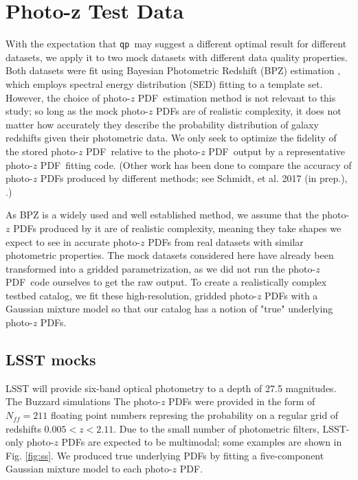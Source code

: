 \documentclass[\docopts]{\docclass}
\newcommand{\qp}{\texttt{qp}}
\newcommand{\pz}{photo-$z$ PDF}
\begin{document}
\section{Photo-z Test Data}
\label{sec:data}

With the expectation that \qp\  may suggest a different optimal result for 
different datasets, we apply it to two mock datasets with different data 
quality properties.  Both datasets were fit using Bayesian Photometric Redshift 
(BPZ) estimation \citep{benitez_bayesian_2000}, which employs spectral energy 
distribution (SED) fitting to a template set.  However, the choice of \pz\ 
estimation method is not relevant to this study; so long as the mock \pz s are 
of realistic complexity, it does not matter how accurately they describe the 
probability distribution of galaxy redshifts given their photometric data.  We 
only seek to optimize the fidelity of the stored \pz\ relative to the \pz\ 
output by a representative \pz\ fitting code.  (Other work has been done to 
compare the accuracy of \pz s produced by different methods; see Schmidt, et 
al. 2017 (in prep.), \citet{tanaka_photometric_2017}.)

As BPZ is a widely used and well established method, we assume that the \pz s 
produced by it are of realistic complexity, meaning they take shapes we expect 
to see in accurate \pz s from real datasets with similar photometric 
properties.  The mock datasets considered here have already been transformed 
into a gridded parametrization, as we did not run the \pz\ code ourselves to 
get the raw output.  To create a realistically complex testbed catalog, we fit 
these high-resolution, gridded \pz s with a Gaussian mixture model so that our 
catalog has a notion of "true" underlying \pz s.  


\subsection{LSST mocks}
\label{sec:ss}


LSST will provide six-band optical photometry to a depth of 27.5 magnitudes.  
  The Buzzard simulations The \pz s 
were provided in the form of $N_{ff}=211$ floating point numbers represing the 
probability on a regular grid of redshifts $0.005 < z < 2.11$.  Due to the 
small number of photometric filters, LSST-only \pz s are expected to be 
multimodal; some examples are shown in Fig. \ref{fig:ss}.  We produced true 
underlying PDFs by fitting a five-component Gaussian mixture model to each \pz.
\end{document}
